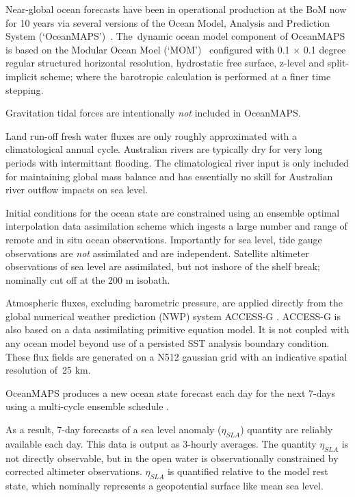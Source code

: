 Near-global ocean forecasts have been in operational production at the BoM now for 10 years via several versions of the Ocean Model, Analysis and Prediction System (`OceanMAPS')~\cite{Brassington:2007ut,NMOC:2007wq,BureauofMeterology:2011ta,Brassington:2012wm}.
The~dynamic ocean model component of OceanMAPS is based on the Modular Ocean Moel (`MOM')~\cite{Griffies:2008vh} configured with 0.1 $\times$ 0.1 degree regular structured horizontal resolution, hydrostatic free surface, z-level and split-implicit scheme; where the barotropic calculation is performed at a finer time stepping. 

Gravitation tidal forces are intentionally \textit{not} included in OceanMAPS.      


Land run-off fresh water fluxes are only roughly approximated with a climatological annual cycle. 
Australian rivers are typically dry for very long periods with intermittant flooding.   
The climatological river input is only included for maintaining global mass balance and has essentially no skill for Australian river outflow impacts on sea level.    


Initial conditions for the ocean state are constrained using an ensemble optimal interpolation data assimilation scheme \cite{Oke:2008wr} which ingests a large number and range of remote and in situ ocean observations. 
Importantly for sea level, tide gauge observations are \textit{not} assimilated and are independent.   
Satellite altimeter observations of sea level are assimilated, but not inshore of the shelf break; nominally cut off at the 200 m isobath.


Atmospheric fluxes, excluding barometric pressure, are applied directly from the global numerical weather prediction (NWP) system ACCESS-G \cite{BureauofMeterology:C8IaJ2Qq}.
ACCESS-G is also based on a data assimilating primitive equation model.
It is not coupled with any ocean model beyond use of a persisted SST analysis boundary condition.
These flux fields are generated on a N512 gaussian grid with an indicative spatial resolution of~25 km. 

OceanMAPS produces a new ocean state forecast each day for the next 7-days using a multi-cycle ensemble schedule \cite{GaryBBrassington:2013jw}.

As a result, 7-day forecasts of a sea level anomaly ($\eta_{SLA}$) quantity are reliably available each day.  
This data is output as 3-hourly averages.  
The quantity $\eta_{SLA}$ is not directly observable, but in the open water is observationally constrained by corrected altimeter observations.
$\eta_{SLA}$ is quantified relative to the model rest state, which nominally represents a geopotential surface like mean sea level.  

